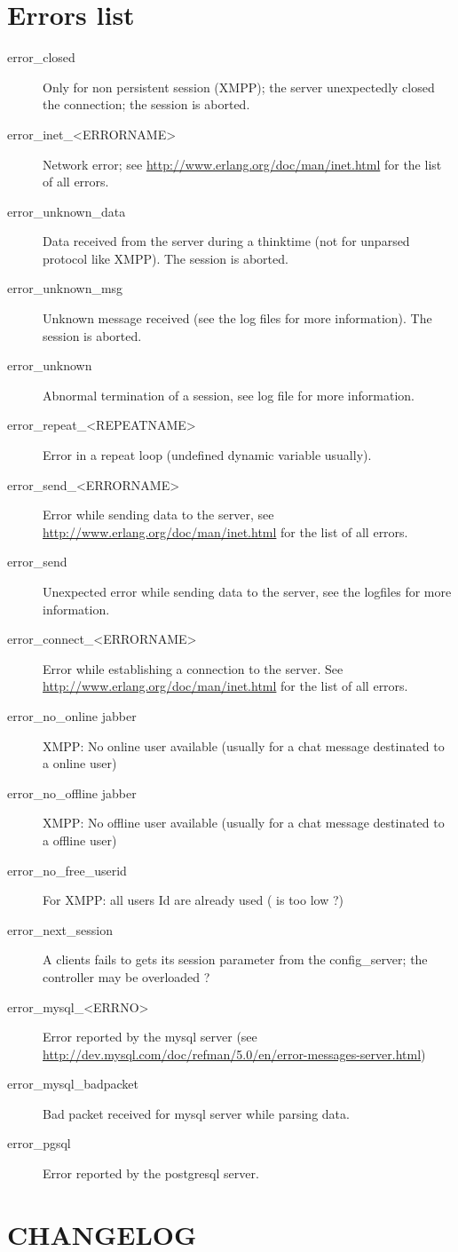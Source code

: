 \documentclass{TSUNG-en}
\begin{document}
\begin{appendix}
\section{Errors list}

\begin{description}
\item[error\_closed] Only for non persistent session (XMPP); the
  server unexpectedly closed the connection; the session is aborted.
\item[error\_inet\_<ERRORNAME>] Network error; see
  \url{http://www.erlang.org/doc/man/inet.html} for the list of all errors.
\item[error\_unknown\_data] Data received from the server during a
  thinktime (not for unparsed protocol like XMPP). The session is
  aborted.
\item[error\_unknown\_msg] Unknown message received (see the log
  files for more information). The session is aborted.
\item[error\_unknown] Abnormal termination of a session, see
  log file for more information.
\item[error\_repeat\_<REPEATNAME>] Error in a repeat loop (undefined
  dynamic variable usually).
\item[error\_send\_<ERRORNAME>] Error while sending data to the
  server, see  \url{http://www.erlang.org/doc/man/inet.html} for the list of all errors.
\item[error\_send] Unexpected error while sending data to the server,
  see the logfiles for more information.
\item[error\_connect\_<ERRORNAME>] Error while establishing a
  connection to the server.  See  \url{http://www.erlang.org/doc/man/inet.html} for the list of all errors.
\item[error\_no\_online jabber] XMPP: No online user available (usually for a
  chat message destinated to a online user)
\item[error\_no\_offline jabber] XMPP: No offline user available (usually for a
  chat message destinated to a offline user)
\item[error\_no\_free\_userid] For XMPP: all users Id are already used
  ( is too low ?)
\item[error\_next\_session] A clients fails to gets its session
  parameter from the config\_server; the controller may be overloaded ?
\item[error\_mysql\_<ERRNO>] Error reported by the mysql server (see \url{http://dev.mysql.com/doc/refman/5.0/en/error-messages-server.html})
\item[error\_mysql\_badpacket] Bad packet received for mysql server while parsing data.
\item[error\_pgsql] Error reported by the postgresql server.
\end{description}

\section{CHANGELOG}
\end{appendix}
\end{document}
